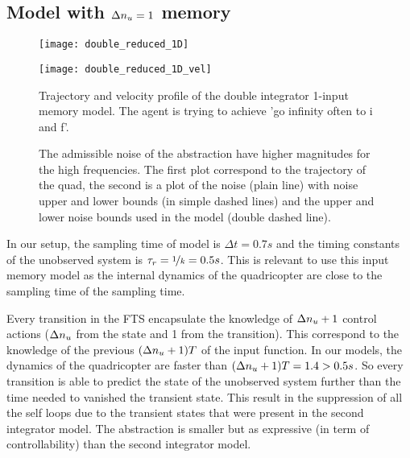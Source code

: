\subsection{Model with $\Delta n_u= 1$ memory}
\begin{figure}[!ht]
	\begin{minipage}[b]{0.5\textwidth}
  		\centering
  		\texttt{[image: double\_reduced\_1D]}
	  	\label{double_reduced_1D}
  \end{minipage}
	\begin{minipage}[b]{0.5\textwidth}
  		\centering
  		\texttt{[image: double\_reduced\_1D\_vel]}
	  	\label{double_reduced_1D_vel}
  \end{minipage}
  \caption{Trajectory and velocity profile of the double integrator 1-input memory model. The agent is trying to achieve 'go infinity often to i and f'.}
\end{figure}

\begin{figure}[!ht]
  	\centering
	
  	\label{double_reduced_1D_noise}
  	\caption{The admissible noise of the abstraction have higher magnitudes for the high frequencies. The first plot correspond to the trajectory of the quad, the second is a plot of the noise (plain line) with noise upper and lower bounds (in simple dashed lines) and the upper and lower noise bounds used in the model (double dashed line).}
\end{figure}

In our setup, the sampling time of model is ${\Delta t = 0.7s}$ and the timing constants of the unobserved system is $\tau_r = {\nicefrac{1}{k} = 0.5s}$. This is relevant to use this input memory model as the internal dynamics of the quadricopter are close to the sampling time of the sampling time.

Every transition in the FTS encapsulate the knowledge of $\Delta n_u +1$ control actions ($\Delta n_u$ from the state and 1 from the transition). This correspond to the knowledge of the previous $(\Delta n_u +1)T$ of the input function. 
In our models, the dynamics of the quadricopter are faster than $(\Delta n_u +1)T = 1.4>0.5s$.
So every transition is able to predict the state of the unobserved system further than the time needed to vanished the transient state.
This result in the suppression of all the self loops due to the transient states that were present in the second integrator model.
The abstraction is smaller but as expressive (in term of controllability) than the second integrator model.

